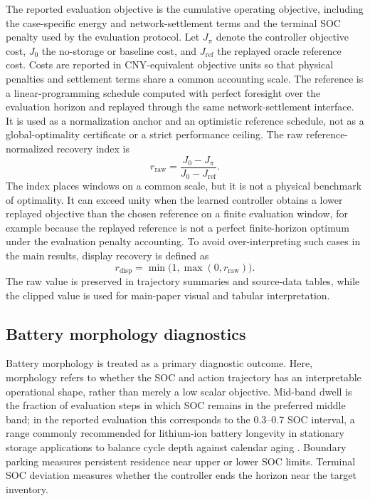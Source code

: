 The reported evaluation objective is the cumulative operating objective, including the case-specific energy and network-settlement terms and the terminal SOC penalty used by the evaluation protocol. Let $J_{\pi}$ denote the controller objective cost, $J_{0}$ the no-storage or baseline cost, and $J_{\mathrm{ref}}$ the replayed oracle reference cost. Costs are reported in CNY-equivalent objective units so that physical penalties and settlement terms share a common accounting scale. The reference is a linear-programming schedule computed with perfect foresight over the evaluation horizon and replayed through the same network-settlement interface. It is used as a normalization anchor and an optimistic reference schedule, not as a global-optimality certificate or a strict performance ceiling. The raw reference-normalized recovery index is
\begin{equation}
r_{\mathrm{raw}}=\frac{J_{0}-J_{\pi}}{J_{0}-J_{\mathrm{ref}}}.
\label{eq:raw_recovery}
\end{equation}
The index places windows on a common scale, but it is not a physical benchmark of optimality. It can exceed unity when the learned controller obtains a lower replayed objective than the chosen reference on a finite evaluation window, for example because the replayed reference is not a perfect finite-horizon optimum under the evaluation penalty accounting. To avoid over-interpreting such cases in the main results, display recovery is defined as
\begin{equation}
r_{\mathrm{disp}}=\min\bigl(1,\max(0,r_{\mathrm{raw}})\bigr).
\label{eq:display_recovery}
\end{equation}
The raw value is preserved in trajectory summaries and source-data tables, while the clipped value is used for main-paper visual and tabular interpretation.

\subsection{Battery morphology diagnostics}

Battery morphology is treated as a primary diagnostic outcome. Here, morphology refers to whether the SOC and action trajectory has an interpretable operational shape, rather than merely a low scalar objective. Mid-band dwell is the fraction of evaluation steps in which SOC remains in the preferred middle band; in the reported evaluation this corresponds to the 0.3--0.7 SOC interval, a range commonly recommended for lithium-ion battery longevity in stationary storage applications to balance cycle depth against calendar aging \cite{xu2018modeling,wang2021degradation}. Boundary parking measures persistent residence near upper or lower SOC limits. Terminal SOC deviation measures whether the controller ends the horizon near the target inventory.

